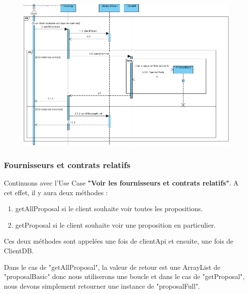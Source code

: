 \begin{figure}[h]
\centering
\includegraphics[height = 0.9\textwidth]{Base/sequence/img/client/Voir les contrats.png}
\end{figure}

\newpage

\subsubsection{Fournisseurs et
contrats relatifs}
\begin{flushleft}
Continuons avec l'Use Case \textbf{"Voir les fournisseurs et
contrats relatifs"}.
A cet effet, il y aura deux méthodes :
\end{flushleft}

\begin{enumerate}
\item getAllProposal si le client souhaite voir toutes les propositions.
\item getProposal si le client souhaite voir une proposition en particulier.
\end{enumerate}

\begin{flushleft}
Ces deux méthodes sont appelées une fois de clientApi et ensuite, une fois de ClientDB.
\end{flushleft}

\begin{flushleft}
Dans le cas de "getAllProposal", la valeur de retour est une ArrayList de "proposalBasic" donc nous utiliserons une boucle et dans le cas de "getProposal", nous devons simplement retourner une instance de "proposalFull".
\end{flushleft}

